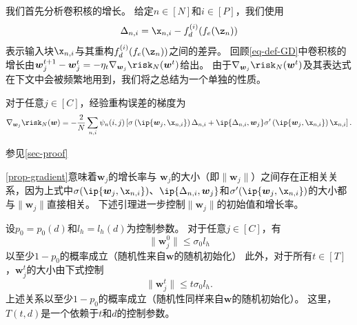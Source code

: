 我们首先分析卷积核的增长。
给定$n \in [N]$和$i \in [P]$，我们使用
\begin{equation}
\Delta_{n,i} = \x_{n,i} - f_d^{(i)} (f_e(\z_n))    
\end{equation}
表示输入块$\x_{n,i}$与其重构$f_d^{(i)} (f_e(\z_n))$之间的差异。
回顾\cref{eq-def-GD}中卷积核的增长由$\boldsymbol{w}_j^{t+1} - \boldsymbol{w}_j^{t} = -\eta_t \nabla_{\boldsymbol{w}_j}\risk_N(\boldsymbol{w}^t)$给出。
由于$\nabla_{\boldsymbol{w}_j}\risk_N(\boldsymbol{w}^t)$及其表达式在下文中会被频繁地用到，我们将之总结为一个单独的性质。
\begin{proposition}\label{prop-gradient}
对于任意$j \in [C]$，经验重构误差的梯度为
\begin{equation*}
        \nabla_{\boldsymbol{w}_j} \risk_N(\boldsymbol{w})
        =
        - \frac{2}{N}  \sum_{n,i} \psi_n(i,j) \left[ \sigma \left(\ip{\boldsymbol{w}_j,\x_{n,i}} \right) \Delta_{n,i} 
         + \ip{\Delta_{n,i}, \boldsymbol{w}_j} \sigma^{\prime}\left(\ip{\boldsymbol{w}_j,\x_{n,i}} \right) \x_{n,i} \right].
\end{equation*}
\end{proposition}
\begin{myproof}
参见\cref{sec-proof}
\end{myproof}
\cref{prop-gradient}意味着$\boldsymbol{w}_j$的增长率与 
$\boldsymbol{w}_j$的大小（即$\| \boldsymbol{w}_j\|$）之间存在正相关关系，因为上式中$\sigma(\ip{\boldsymbol{w}_j,\x_{n,i}})$、$\ip{\Delta_{n,i}, \boldsymbol{w}_j}$和$\sigma^{\prime}(\ip{\boldsymbol{w}_j,\x_{n,i}})$的大小都与$\| \boldsymbol{w}_j \|$直接相关。
下述引理进一步控制$\|\boldsymbol{w}_j\|$的初始值和增长率。
\begin{lemma}\label{lemma-size-of-wj-in-paper}
设$p_0 = p_0(d)$和$l_h = l_h(d)$为控制参数。
对于任意$ j \in [C]$，有
\begin{equation}\label{eq-lemma-size-of-wj-random-initialization-in-paper}
    \|\boldsymbol{w}_j^0\| \leq \sigma_0 l_h
\end{equation}
以至少$1 - p_0$的概率成立（随机性来自$\boldsymbol{w}$的随机初始化）
此外，对于所有$ t \in [T]$，$\boldsymbol{w}_j^t$的大小由下式控制
    \begin{equation}\label{eq-lemma-size-of-wj-result-2-in-paper}
        \|\boldsymbol{w}_j^t\| \leq  t \sigma_0 l_h.
    \end{equation}
    上述关系以至少$1 - p_0$的概率成立（随机性同样来自$\boldsymbol{w}$的随机初始化）。
    这里，$T(t,d)$是一个依赖于$t$和$d$的控制参数。
\end{lemma}

